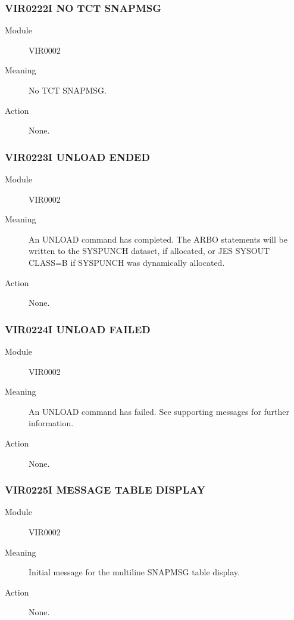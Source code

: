 \documentclass[letterpaper,10pt,english]{sphinxmanual}
\begin{document}
\subsubsection{VIR0222I NO TCT SNAPMSG}
\label{\detokenize{messages:vir0222i-no-tct-snapmsg}}\begin{description}
\item[{Module}] \leavevmode
VIR0002

\item[{Meaning}] \leavevmode
No TCT SNAPMSG.

\item[{Action}] \leavevmode
None.

\end{description}


\subsubsection{VIR0223I UNLOAD ENDED}
\label{\detokenize{messages:vir0223i-unload-ended}}\begin{description}
\item[{Module}] \leavevmode
VIR0002

\item[{Meaning}] \leavevmode
An UNLOAD command has completed. The ARBO statements will be written to the SYSPUNCH dataset, if allocated, or JES SYSOUT CLASS=B if SYSPUNCH was dynamically allocated.

\item[{Action}] \leavevmode
None.

\end{description}


\subsubsection{VIR0224I UNLOAD FAILED}
\label{\detokenize{messages:vir0224i-unload-failed}}\begin{description}
\item[{Module}] \leavevmode
VIR0002

\item[{Meaning}] \leavevmode
An UNLOAD command has failed. See supporting messages for further information.

\item[{Action}] \leavevmode
None.

\end{description}


\subsubsection{VIR0225I MESSAGE TABLE DISPLAY}
\label{\detokenize{messages:vir0225i-message-table-display}}\begin{description}
\item[{Module}] \leavevmode
VIR0002

\item[{Meaning}] \leavevmode
Initial message for the multiline SNAPMSG table display.

\item[{Action}] \leavevmode
None.

\end{description}
\end{document}
